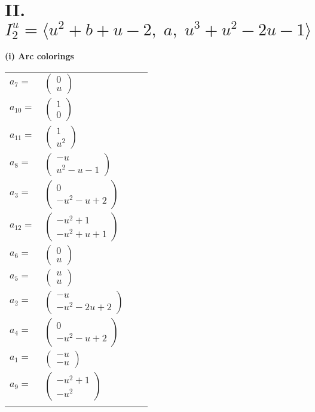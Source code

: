 \documentclass[1p]{elsarticle_modified}
\theoremstyle{definition}
\begin{document}
\centering \section*{II. $I^u_{2}= \langle u^2+b+u-2,\;a,\;u^3+u^2-2 u-1 \rangle$}
\flushleft \textbf{(i) Arc colorings}\\
\begin{tabular}{m{7pt} m{180pt} m{7pt} m{180pt} }
\flushright $a_{7}=$&$\begin{pmatrix}0\\u\end{pmatrix}$ \\
\flushright $a_{10}=$&$\begin{pmatrix}1\\0\end{pmatrix}$ \\
\flushright $a_{11}=$&$\begin{pmatrix}1\\u^2\end{pmatrix}$ \\
\flushright $a_{8}=$&$\begin{pmatrix}- u\\u^2- u-1\end{pmatrix}$ \\
\flushright $a_{3}=$&$\begin{pmatrix}0\\- u^2- u+2\end{pmatrix}$ \\
\flushright $a_{12}=$&$\begin{pmatrix}- u^2+1\\- u^2+u+1\end{pmatrix}$ \\
\flushright $a_{6}=$&$\begin{pmatrix}0\\u\end{pmatrix}$ \\
\flushright $a_{5}=$&$\begin{pmatrix}u\\u\end{pmatrix}$ \\
\flushright $a_{2}=$&$\begin{pmatrix}- u\\- u^2-2 u+2\end{pmatrix}$ \\
\flushright $a_{4}=$&$\begin{pmatrix}0\\- u^2- u+2\end{pmatrix}$ \\
\flushright $a_{1}=$&$\begin{pmatrix}- u\\- u\end{pmatrix}$ \\
\flushright $a_{9}=$&$\begin{pmatrix}- u^2+1\\- u^2\end{pmatrix}$\\&\end{tabular}
\end{document}
